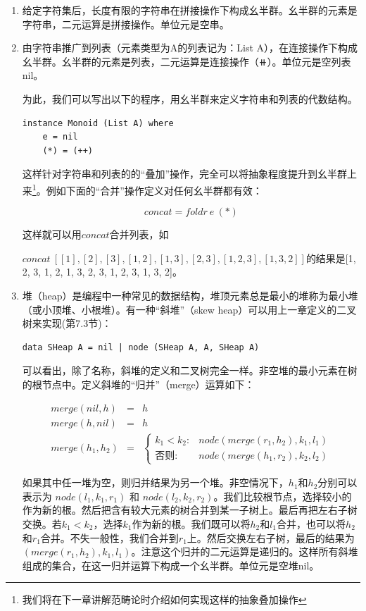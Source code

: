 \documentclass[b5paper]{ctexart}
\begin{document}
\begin{enumerate}
\item 给定字符集后，长度有限的字符串在拼接操作下构成幺半群。幺半群的元素是字符串，二元运算是拼接操作。单位元是空串。
\item 由字符串推广到列表（元素类型为A的列表记为：List A），在连接操作下构成幺半群。幺半群的元素是列表，二元运算是连接操作（$\doubleplus$）。单位元是空列表nil。

为此，我们可以写出以下的程序，用幺半群来定义字符串和列表的代数结构。

\begin{lstlisting}
instance Monoid (List A) where
    e = nil
    (*) = (++)
\end{lstlisting}

这样针对字符串和列表的的“叠加”操作，完全可以将抽象程度提升到幺半群上来\footnote{我们将在下一章讲解范畴论时介绍如何实现这样的抽象叠加操作}。例如下面的“合并”操作定义对任何幺半群都有效：

\[
concat = foldr\ e\ (*)
\]

这样就可以用$concat$合并列表，如

$concat\ [[1], [2], [3], [1, 2], [1, 3], [2, 3], [1, 2, 3], [1, 3, 2]]$的结果是[1, 2, 3, 1, 2, 1, 3, 2, 3, 1, 2, 3, 1, 3, 2]。

\item 堆（heap）是编程中一种常见的数据结构，堆顶元素总是最小的堆称为最小堆（或小顶堆、小根堆）。有一种“斜堆”（skew heap）可以用上一章定义的二叉树来实现(\cite{LiuXinyu2017}第7.3节)：

\begin{lstlisting}
data SHeap A = nil | node (SHeap A, A, SHeap A)
\end{lstlisting}

可以看出，除了名称，斜堆的定义和二叉树完全一样。非空堆的最小元素在树的根节点中。定义斜堆的“归并”（merge）运算如下：

\[
\begin{array}{rcl}
merge(nil, h) & = & h \\
merge(h, nil) & = & h \\
merge(h_1, h_2) & = &
  \begin{cases}
  k_1 < k_2 : & node(merge(r_1, h_2), k_1, l_1) \\
  \text{否则}: & node(merge(h_1, r_2), k_2, l_2)
  \end{cases}
\end{array}
\]

如果其中任一堆为空，则归并结果为另一个堆。非空情况下，$h_1$和$h_2$分别可以表示为 $node(l_1, k_1, r_1)$ 和 $node(l_2, k_2, r_2)$。我们比较根节点，选择较小的作为新的根。然后把含有较大元素的树合并到某一子树上。最后再把左右子树交换。若$k_1 < k_2$，选择$k_1$作为新的根。我们既可以将$h_2$和$l_1$合并，也可以将$h_2$和$r_1$合并。不失一般性，我们合并到$r_1$上。然后交换左右子树，最后的结果为$(merge(r_1, h_2), k_1, l_1)$。注意这个归并的二元运算是递归的。这样所有斜堆组成的集合，在这一归并运算下构成一个幺半群。单位元是空堆nil。


\end{enumerate}
\end{document}
